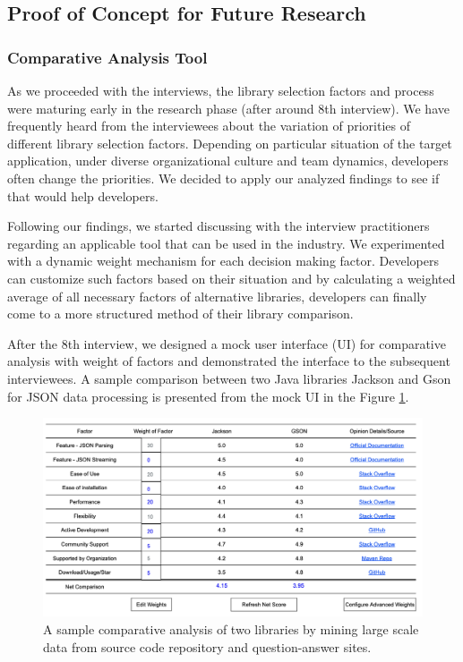 \subsection{Proof of Concept for Future Research}
\subsubsection{Comparative Analysis Tool}
As we proceeded with the interviews, the library selection factors and process were maturing early in the research phase (after around 8th interview). We have frequently heard from the interviewees about the variation of priorities of different library selection factors. Depending on particular situation of the target application, under diverse organizational culture and team dynamics, developers often change the priorities. We decided to apply our analyzed findings to see if that would help developers.

Following our findings, we started discussing with the interview practitioners regarding an applicable tool that can be used in the industry. We experimented with a dynamic weight mechanism for each decision making factor. Developers can customize such factors based on their situation and by calculating a weighted average of all necessary factors of alternative libraries, developers can finally come to a more structured method of their library comparison. 

After the 8th interview, we designed a mock user interface (UI) for comparative analysis with weight of factors and demonstrated the interface to the subsequent interviewees. A sample comparison between two Java libraries Jackson and Gson for JSON data processing is presented from the mock UI in the Figure \ref{fig:ui-library-comparison}.
\begin{figure}
    \centering
    \includegraphics[scale=0.4]{images/mock-ui-library-comparison.png}
    \caption{A sample comparative analysis of two libraries by mining large scale data from source code repository and question-answer sites.}
    \label{fig:ui-library-comparison}
\end{figure}

